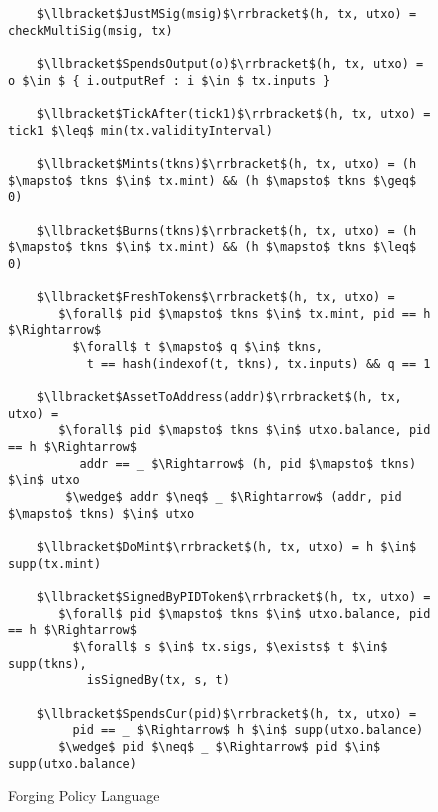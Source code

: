 \begin{figure}[t]
    \begin{lstlisting}
    $\llbracket$JustMSig(msig)$\rrbracket$(h, tx, utxo) = checkMultiSig(msig, tx)

    $\llbracket$SpendsOutput(o)$\rrbracket$(h, tx, utxo) = o $\in $ { i.outputRef : i $\in $ tx.inputs }

    $\llbracket$TickAfter(tick1)$\rrbracket$(h, tx, utxo) = tick1 $\leq$ min(tx.validityInterval)

    $\llbracket$Mints(tkns)$\rrbracket$(h, tx, utxo) = (h $\mapsto$ tkns $\in$ tx.mint) && (h $\mapsto$ tkns $\geq$ 0)

    $\llbracket$Burns(tkns)$\rrbracket$(h, tx, utxo) = (h $\mapsto$ tkns $\in$ tx.mint) && (h $\mapsto$ tkns $\leq$ 0)

    $\llbracket$FreshTokens$\rrbracket$(h, tx, utxo) =
       $\forall$ pid $\mapsto$ tkns $\in$ tx.mint, pid == h $\Rightarrow$
         $\forall$ t $\mapsto$ q $\in$ tkns,
           t == hash(indexof(t, tkns), tx.inputs) && q == 1

    $\llbracket$AssetToAddress(addr)$\rrbracket$(h, tx, utxo) =
       $\forall$ pid $\mapsto$ tkns $\in$ utxo.balance, pid == h $\Rightarrow$
          addr == _ $\Rightarrow$ (h, pid $\mapsto$ tkns) $\in$ utxo
        $\wedge$ addr $\neq$ _ $\Rightarrow$ (addr, pid $\mapsto$ tkns) $\in$ utxo

    $\llbracket$DoMint$\rrbracket$(h, tx, utxo) = h $\in$ supp(tx.mint)

    $\llbracket$SignedByPIDToken$\rrbracket$(h, tx, utxo) =
       $\forall$ pid $\mapsto$ tkns $\in$ utxo.balance, pid == h $\Rightarrow$
         $\forall$ s $\in$ tx.sigs, $\exists$ t $\in$ supp(tkns),
           isSignedBy(tx, s, t)

    $\llbracket$SpendsCur(pid)$\rrbracket$(h, tx, utxo) =
         pid == _ $\Rightarrow$ h $\in$ supp(utxo.balance)
       $\wedge$ pid $\neq$ _ $\Rightarrow$ pid $\in$ supp(utxo.balance)
    \end{lstlisting}
    \caption{Forging Policy Language}
    \label{figure:fps-language}
\end{figure}
%
